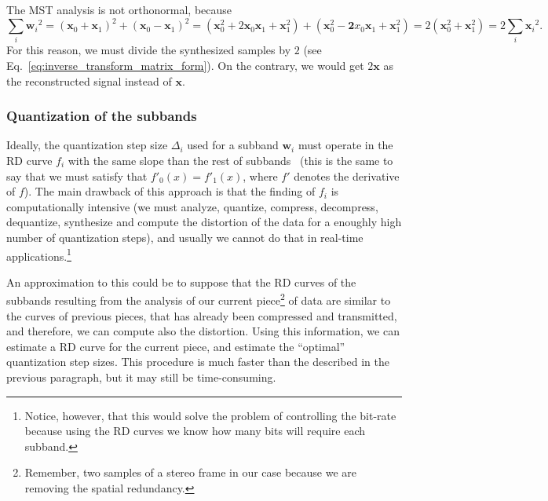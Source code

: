 The MST analysis is not orthonormal, because
\begin{equation}
  \sum_i {{\mathbf w}_i}^2 =
  ({\mathbf x}_0 + {\mathbf x}_1)^2 + ({\mathbf x}_0 - {\mathbf x}_1)^2 =
  ({\mathbf x}_0^2 + 2{\mathbf x}_0{\mathbf x}_1+{\mathbf x}_1^2) + ({\mathbf x}_0^2-{\mathbf 2}x_0{\mathbf x}_1+{\mathbf x}_1^2) =
  2({\mathbf x}_0^2+{\mathbf x}_1^2) =
  2\sum_i {{\mathbf x}_i}^2.
  \label{eq:No_Parseval}
\end{equation}
For this reason, we must divide the synthesized samples by $2$ (see
Eq.~\eqref{eq:inverse_transform_matrix_form}). On the contrary, we would
get $2{\mathbf x}$ as the reconstructed signal instead of ${\mathbf x}$.

\subsubsection{Quantization of the subbands}
Ideally, the quantization step size $\Delta_i$ used for a subband
${\mathbf w}_i$ must operate in the RD curve $f_i$ with the same slope
than the rest of
subbands~\cite{vetterli2014foundations,sayood2017introduction} (this
is the same to say that we must satisfy that $f'_0(x)=f'_1(x)$, where
$f'$ denotes the derivative of $f$). The main drawback of this
approach is that the finding of $f_i$ is computationally intensive (we
must analyze, quantize, compress, decompress, dequantize, synthesize
and compute the distortion of the data for a enoughly high number of
quantization steps), and usually we cannot do that in real-time
applications.\footnote{Notice, however, that this would solve the
problem of controlling the bit-rate because using the RD curves we
know how many bits will require each subband.}

An approximation to this could be to suppose that the RD curves of the
subbands resulting from the analysis of our current
piece\footnote{Remember, two samples of a stereo frame in our case
  because we are removing the spatial redundancy.} of data are similar
to the curves of previous pieces, that has already been compressed and
transmitted, and therefore, we can compute also the distortion. Using
this information, we can estimate a RD curve for the current piece,
and estimate the ``optimal'' quantization step sizes. This procedure
is much faster than the described in the previous paragraph, but it may
still be time-consuming.


